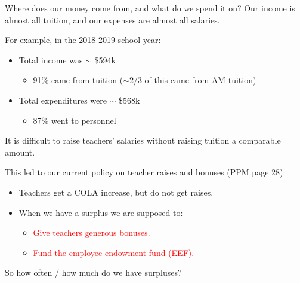 \documentclass[8pt]{beamer}
\begin{document}
\begin{frame}{Where does our money come from, and what do we spend it on?}
%
Our income is almost all tuition, and our expenses are almost all salaries.

For example, in the 2018-2019 school year:
%
\begin{itemize}
%
\item Total income was $\sim$ \$594k
\begin{itemize}
    \item 91\% came from tuition ($\sim 2/3$ of this came from AM tuition)
\end{itemize}
%
\item Total expenditures were $\sim$ \$568k
\begin{itemize}
    \item 87\% went to personnel
\end{itemize}
%
\end{itemize}
%

It is difficult to raise teachers' salaries without
raising tuition a comparable amount.

This led to our current policy on teacher raises and bonuses (PPM page 28):

%
\begin{itemize}
%
\item Teachers get a COLA increase, but do not get raises.
\item  When we have a surplus we are supposed to:
\begin{itemize}
\item \textcolor{red}{Give teachers generous bonuses.}
\item \textcolor{red}{Fund the employee endowment fund (EEF).}
\end{itemize}
%
\end{itemize}
%

So how often / how much do we have surpluses?

%
\end{frame}
\end{document}

